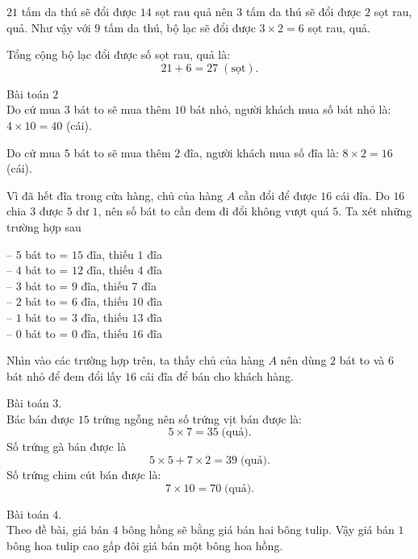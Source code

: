 $21$ tấm da thú sẽ đổi được $14$ sọt rau quả nên $3$ tấm da thú sẽ đổi được $2$ sọt rau, quả. Như vậy với $9$ tấm da thú, bộ lạc sẽ đổi được $3\times 2= 6$ sọt rau, quả. %

Tổng cộng bộ lạc đổi được số sọt rau, quả là: $$21+6=27 \;(\text{sọt}).$$

Bài toán $2$\\
Do cứ mua $3$ bát to sẽ mua thêm $10$ bát nhỏ, người khách mua số bát nhỏ là:  $4\times 10= 40$ (cái).

Do cứ mua $5$ bát to sẽ mua thêm $2$ đĩa, người khách mua số đĩa là: $ 8\times 2= 16$ (cái).

Vì đã hết đĩa trong cửa hàng, chủ của hàng $A$ cần đổi để được $16$ cái đĩa. Do $16$ chia $3$ được $5$ dư $1$, nên số bát to cần đem đi đổi không vượt quá $5$. Ta xét những trường hợp sau

--	$5$ bát to  =  $15$ đĩa, thiếu $1$ đĩa\\
--	$4$ bát to  =   $12$ đĩa, thiếu $4$ đĩa\\
--	$3$ bát to = $9$ đĩa, thiếu $7$ đĩa\\
--	$2$ bát to = $6$ đĩa, thiếu $10$ đĩa\\
--	$1$ bát to = $3$ đĩa, thiếu $13$ đĩa\\
--	$0$ bát to = $0$ đĩa, thiếu $16$ đĩa

Nhìn vào các trường hợp trên, ta thấy chủ của hàng $A$ nên dùng $2$ bát to và $6$ bát nhỏ để đem đổi lấy $16$ cái đĩa để bán cho khách hàng.

Bài toán $3$.\\
Bác bán được $15$ trứng ngỗng nên số trứng vịt bán được là: 
$$5\times 7=35 \;\text{(quả)}.$$
Số trứng gà bán được là
$$5\times 5+ 7\times 2= 39 \;\text{(quả)}.$$
Số trứng chim cút bán được là:
$$7\times 10=70 \;\text{(quả)}.$$

Bài toán $4.$\\
Theo đề bài, giá bán $4$ bông hồng sẽ bằng giá bán hai bông tulip. Vậy giá bán $1$ bông hoa tulip cao gấp đôi giá bán một bông hoa hồng.

